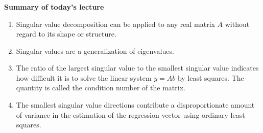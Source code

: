 \begin{frame}[fragile] \frametitle{}

\textbf{Summary of today's lecture}

\begin{enumerate}
\item Singular value decomposition can be applied to any real
matrix $A$ without regard to its shape or structure. \pause
\item Singular values are a generalization of eigenvalues.\pause
\item The ratio of the largest singular value to the smallest
singular value indicates how difficult it is to solve the
linear system $y = Ab$ by least squares. The quantity is called
the condition number of the matrix.\pause
\item The smallest singular value directions contribute a disproportionate
amount of variance in the estimation of the regression vector using
ordinary least squares.
\end{enumerate}

\end{frame}













